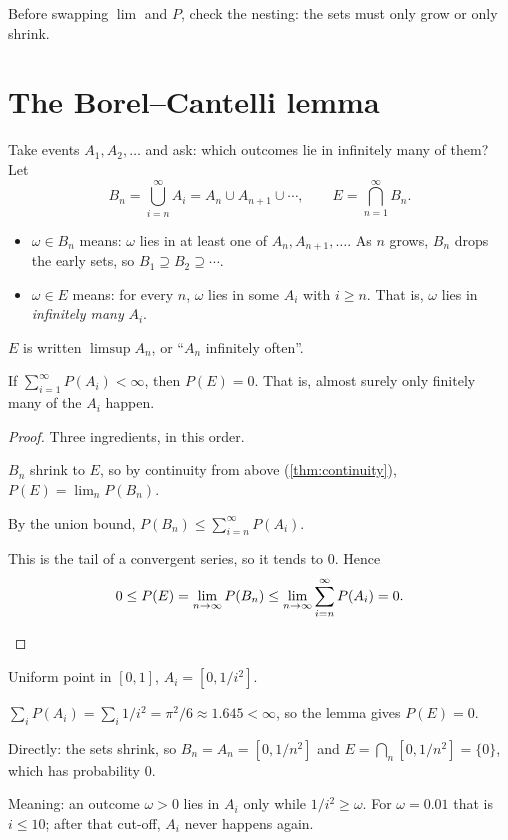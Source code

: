 Before swapping $\lim$ and $P$, check the nesting: the sets must only grow or only shrink.

\section{The Borel--Cantelli lemma}

Take events $A_1,A_2,\ldots$ and ask: which outcomes lie in infinitely many of them? Let
\[
  B_n=\bigcup_{i=n}^\infty A_i=A_n\cup A_{n+1}\cup\cdots,\qquad E=\bigcap_{n=1}^\infty B_n .
\]
\begin{itemize}
  \item $\omega\in B_n$ means: $\omega$ lies in at least one of $A_n,A_{n+1},\ldots$. As $n$ grows, $B_n$ drops the early sets, so $B_1\supseteq B_2\supseteq\cdots$.
  \item $\omega\in E$ means: for every $n$, $\omega$ lies in some $A_i$ with $i\ge n$. That is, $\omega$ lies in \emph{infinitely many} $A_i$.
\end{itemize}
$E$ is written $\limsup A_n$, or ``$A_n$ infinitely often''.

\begin{theorem}
\label{thm:bc}
If $\sum_{i=1}^\infty P(A_i)<\infty$, then $P(E)=0$. That is, almost surely only finitely many of the $A_i$ happen.
\end{theorem}
\begin{proof}
Three ingredients, in this order.
\begin{steps}
  \item $B_n$ shrink to $E$, so by continuity from above (\cref{thm:continuity}), $P(E)=\lim_n P(B_n)$.
  \item By the union bound, $P(B_n)\le\sum_{i=n}^\infty P(A_i)$.
  \item This is the tail of a convergent series, so it tends to $0$. Hence
  \[
    0\le P(E)=\lim_{n\to\infty}P(B_n)\le\lim_{n\to\infty}\sum_{i=n}^\infty P(A_i)=0. \qedhere
  \]
\end{steps}
\end{proof}

\begin{example}
\label{ex:bc}
Uniform point in $[0,1]$, $A_i=[0,1/i^2]$.
\begin{steps}
  \item $\sum_i P(A_i)=\sum_i 1/i^2=\pi^2/6\approx1.645<\infty$, so the lemma gives $P(E)=0$.
  \item Directly: the sets shrink, so $B_n=A_n=[0,1/n^2]$ and $E=\bigcap_n[0,1/n^2]=\{0\}$, which has probability $0$.
  \item Meaning: an outcome $\omega>0$ lies in $A_i$ only while $1/i^2\ge\omega$. For $\omega=0.01$ that is $i\le10$; after that cut-off, $A_i$ never happens again.
\end{steps}
\end{example}

